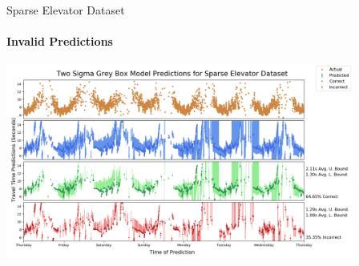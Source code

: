 \documentclass{beamer}
\begin{document}
\begin{frame}[t]{Sparse Elevator Dataset}
  \framesubtitle{Invalid Predictions}

  {\includegraphics[width = 4.5in]{images/elevator/two_sigma_grey_box_model_predictions_for_sparse_elevator_dataset.png}}

\end{frame}



%
%
\end{document}
